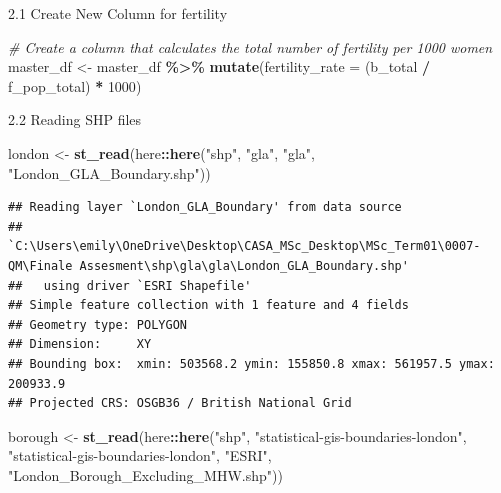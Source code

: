 \documentclass[
]{article}
\newenvironment{Shaded}{\begin{snugshade}}{\end{snugshade}}
\newcommand{\AttributeTok}[1]{\textcolor[rgb]{0.13,0.29,0.53}{#1}}
\newcommand{\CommentTok}[1]{\textcolor[rgb]{0.56,0.35,0.01}{\textit{#1}}}
\newcommand{\DecValTok}[1]{\textcolor[rgb]{0.00,0.00,0.81}{#1}}
\newcommand{\FunctionTok}[1]{\textcolor[rgb]{0.13,0.29,0.53}{\textbf{#1}}}
\newcommand{\NormalTok}[1]{#1}
\newcommand{\OtherTok}[1]{\textcolor[rgb]{0.56,0.35,0.01}{#1}}
\newcommand{\SpecialCharTok}[1]{\textcolor[rgb]{0.81,0.36,0.00}{\textbf{#1}}}
\newcommand{\StringTok}[1]{\textcolor[rgb]{0.31,0.60,0.02}{#1}}
\begin{document}
2.1 Create New Column for fertility

\begin{Shaded}
\begin{Highlighting}[]
\CommentTok{\# Create a column that calculates the total number of fertility per 1000 women}
\NormalTok{master\_df }\OtherTok{\textless{}{-}}\NormalTok{ master\_df }\SpecialCharTok{\%\textgreater{}\%}
  \FunctionTok{mutate}\NormalTok{(}\AttributeTok{fertility\_rate =}\NormalTok{ (b\_total }\SpecialCharTok{/}\NormalTok{ f\_pop\_total) }\SpecialCharTok{*} \DecValTok{1000}\NormalTok{)}
\end{Highlighting}
\end{Shaded}

2.2 Reading SHP files

\begin{Shaded}
\begin{Highlighting}[]
\NormalTok{london }\OtherTok{\textless{}{-}} \FunctionTok{st\_read}\NormalTok{(here}\SpecialCharTok{::}\FunctionTok{here}\NormalTok{(}\StringTok{"shp"}\NormalTok{,}
                            \StringTok{"gla"}\NormalTok{,}
                            \StringTok{"gla"}\NormalTok{,}
                            \StringTok{"London\_GLA\_Boundary.shp"}\NormalTok{))}
\end{Highlighting}
\end{Shaded}

\begin{verbatim}
## Reading layer `London_GLA_Boundary' from data source 
##   `C:\Users\emily\OneDrive\Desktop\CASA_MSc_Desktop\MSc_Term01\0007-QM\Finale Assesment\shp\gla\gla\London_GLA_Boundary.shp' 
##   using driver `ESRI Shapefile'
## Simple feature collection with 1 feature and 4 fields
## Geometry type: POLYGON
## Dimension:     XY
## Bounding box:  xmin: 503568.2 ymin: 155850.8 xmax: 561957.5 ymax: 200933.9
## Projected CRS: OSGB36 / British National Grid
\end{verbatim}

\begin{Shaded}
\begin{Highlighting}[]
\NormalTok{borough }\OtherTok{\textless{}{-}} \FunctionTok{st\_read}\NormalTok{(here}\SpecialCharTok{::}\FunctionTok{here}\NormalTok{(}\StringTok{"shp"}\NormalTok{,}
                            \StringTok{"statistical{-}gis{-}boundaries{-}london"}\NormalTok{,}
                            \StringTok{"statistical{-}gis{-}boundaries{-}london"}\NormalTok{,}
                            \StringTok{"ESRI"}\NormalTok{,}
                            \StringTok{"London\_Borough\_Excluding\_MHW.shp"}\NormalTok{))}
\end{Highlighting}
\end{Shaded}
\end{document}
